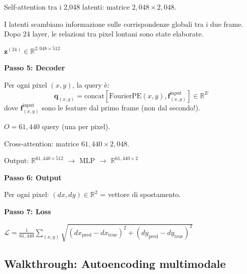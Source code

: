 \documentclass[12pt,a4paper]{article}
\begin{document}
\begin{examplebox}
Self-attention tra i 2{,}048 latenti: matrice $2{,}048 \times 2{,}048$.

I latenti scambiano informazione sulle corrispondenze globali tra i due frame. Dopo 24 layer, le relazioni tra pixel lontani sono state elaborate.

$\mathbf{z}^{(24)} \in \mathbb{R}^{2{,}048 \times 512}$

\textbf{Passo 5: Decoder}

Per ogni pixel $(x, y)$, la query \`e:
\[
\mathbf{q}_{(x,y)} = \text{concat}[\text{FourierPE}(x, y), \mathbf{f}_{(x,y)}^{\text{input}}] \in \mathbb{R}^{E}
\]
dove $\mathbf{f}_{(x,y)}^{\text{input}}$ sono le feature dal primo frame (non dal secondo!).

$O = 61{,}440$ query (una per pixel).

Cross-attention: matrice $61{,}440 \times 2{,}048$.

Output: $\mathbb{R}^{61{,}440 \times 512}$ $\to$ MLP $\to$ $\mathbb{R}^{61{,}440 \times 2}$

\textbf{Passo 6: Output}

Per ogni pixel: $(dx, dy) \in \mathbb{R}^2$ = vettore di spostamento.

\textbf{Passo 7: Loss}

$\mathcal{L} = \frac{1}{61{,}440}\sum_{(x,y)} \sqrt{(dx_{\text{pred}} - dx_{\text{true}})^2 + (dy_{\text{pred}} - dy_{\text{true}})^2}$
\end{examplebox}

\subsection{Walkthrough: Autoencoding multimodale}
\end{document}
